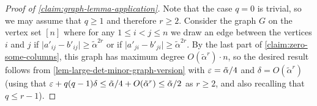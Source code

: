\documentclass{daj}
\theoremstyle{plain}
\theoremstyle{plain}
\theoremstyle{plain}
\theoremstyle{plain}
\theoremstyle{definition}
\theoremstyle{plain}
\theoremstyle{plain}
\theoremstyle{definition}
\theoremstyle{definition}
\theoremstyle{plain}
\begin{document}
\begin{proof}
[Proof of \cref{claim:graph-lemma-application}]
Note that the case $q=0$ is trivial, so we may assume that $q\geq 1$ and therefore $r\geq 2$. Consider the graph $G$ on the vertex set $[n]$ where for any $1\leq i<j\leq n$ we draw an edge between the vertices $i$ and $j$ if $\vert a'_{ij}-b'_{ij}\vert\geq \tilde{\alpha}^{2r}$ or if $\vert a'_{ji}-b'_{ji}\vert\geq \tilde{\alpha}^{2r}$. By the last part of \cref{claim:zero-some-columns}, this graph has maximum degree $O(\tilde{\alpha}^{r})\cdot n$, so the desired result follows from \cref{lem-large-det-minor-graph-version} with $\varepsilon=\tilde{\alpha}/4$ and $\delta=O(\tilde\alpha^r)$ (using that $\varepsilon+q(q-1)\delta\leq \tilde{\alpha}/4+O(\tilde\alpha^r)\leq \tilde\alpha/2$ as $r\geq 2$, and also recalling that $q\leq r-1$).
\end{proof}
\end{document}
